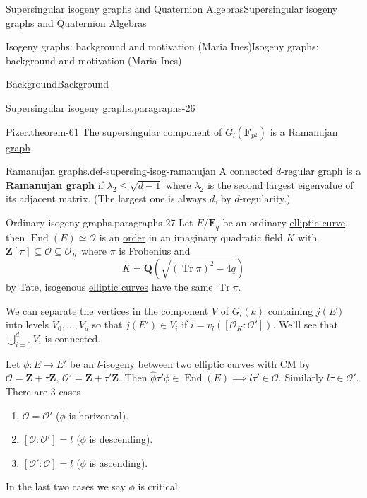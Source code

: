 \documentclass[10pt,]{book}
\newcommand{\terminology}[1]{\textbf{#1}}
\numberwithin{equation}{section}
\newcommand{\lb}{[}
\newcommand{\rb}{]}
\newcommand{\ZZ}{\mathbf{Z}}
\newcommand{\QQ}{\mathbf{Q}}
\newcommand{\FF}{\mathbf{F}}
\newcommand{\ints}{\mathcal{O}}
\DeclareMathOperator{\End}{End}
\DeclareMathOperator{\trace}{Tr}
\begin{document}
\begin{chapterptx}{Supersingular isogeny graphs and Quaternion Algebras}{}{Supersingular isogeny graphs and Quaternion Algebras}{}{}
\begin{sectionptx}{Isogeny graphs: background and motivation (Maria Ines)}{}{Isogeny graphs: background and motivation (Maria Ines)}{}{}
\begin{subsectionptx}{Background}{}{Background}{}{}
\begin{paragraphs}{Supersingular isogeny graphs.}{paragraphs-26}
\begin{theorem}{Pizer.}{}{theorem-61}
\hypertarget{p-807}{}%
The supersingular component of \(G_l(\FF_{p^2})\) is a \hyperref[def-supersing-isog-ramanujan]{Ramanujan graph}.%
\end{theorem}
\begin{definition}{Ramanujan graphs.}{def-supersing-isog-ramanujan}%
\hypertarget{p-808}{}%
A connected \(d\)-regular graph is a \terminology{Ramanujan graph} if \(\lambda_2 \le \sqrt{d-1}\) where \(\lambda_2\) is the second largest eigenvalue of its adjacent matrix. (The largest one is always \(d\), by \(d\)-regularity.)%
\end{definition}
\end{paragraphs}%
\begin{paragraphs}{Ordinary isogeny graphs.}{paragraphs-27}%
\hypertarget{p-809}{}%
Let \(E/\FF_q\) be an ordinary \hyperref[def-supersing-isog-ec]{elliptic curve}, then \(\End(E) \simeq \ints\) is an \hyperref[def-order-quaternion]{order} in an imaginary quadratic field \(K\) with \(\ZZ\lb \pi \rb \subseteq \ints \subseteq \ints_K\) where \(\pi\) is Frobenius and%
\begin{equation*}
K = \QQ(\sqrt{(\trace \pi)^2 - 4q})
\end{equation*}
by Tate, isogenous \hyperref[def-supersing-isog-ec]{elliptic curves} have the same \(\trace \pi\).%
\par
\hypertarget{p-810}{}%
We can separate the vertices in the component \(V\) of \(G_l(k)\) containing \(j(E)\) into levels \(V_0, \ldots, V_d\) so that \(j(E') \in V_i\) if \(i = v_l(\lb \ints_K : \ints'\rb)\). We'll see that \(\bigcup_{i=0}^d V_i\) is connected.%
\par
\hypertarget{p-811}{}%
Let \(\phi\colon E\to E'\) be an \(l\)-\hyperref[def-supersing-isog-isog]{isogeny} between two \hyperref[def-supersing-isog-ec]{elliptic curves} with CM by \(\ints = \ZZ+\tau\ZZ\), \(\ints ' = \ZZ+\tau'\ZZ\). Then \(\hat\phi \tau' \phi \in \End(E) \implies l\tau ' \in \ints\). Similarly \(l\tau \in \ints'\). There are 3 cases\leavevmode%
\begin{enumerate}
\item\hypertarget{li-194}{}\(\ints = \ints'\) (\(\phi\) is horizontal).%
\item\hypertarget{li-195}{}\(\lb\ints : \ints' \rb = l\) (\(\phi\) is descending).%
\item\hypertarget{li-196}{}\(\lb\ints' : \ints \rb = l\) (\(\phi\) is ascending).%
\end{enumerate}
In the last two cases we say \(\phi\) is critical.%
\end{paragraphs}%

\end{subsectionptx}
\end{sectionptx}
\end{chapterptx}
\end{document}
